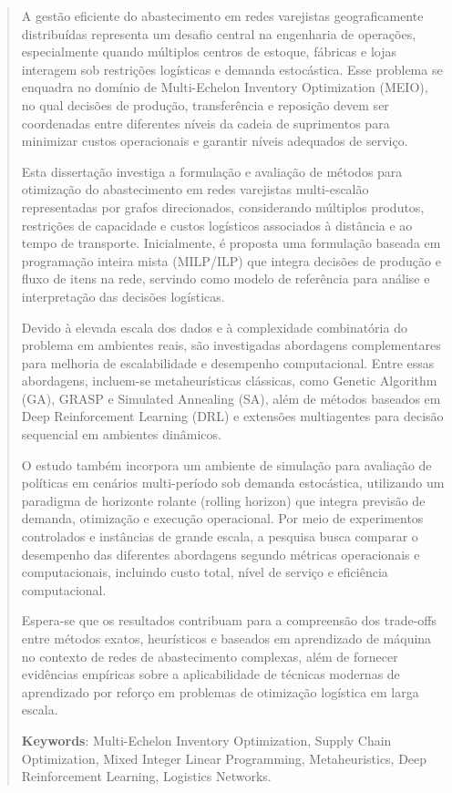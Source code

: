 \documentclass[dissertacao]{ic}
\begin{document}
\begin{abstract}

A gestão eficiente do abastecimento em redes varejistas geograficamente distribuídas representa um desafio central na engenharia de operações, especialmente quando múltiplos centros de estoque, fábricas e lojas interagem sob restrições logísticas e demanda estocástica. Esse problema se enquadra no domínio de Multi-Echelon Inventory Optimization (MEIO), no qual decisões de produção, transferência e reposição devem ser coordenadas entre diferentes níveis da cadeia de suprimentos para minimizar custos operacionais e garantir níveis adequados de serviço.

Esta dissertação investiga a formulação e avaliação de métodos para otimização do abastecimento em redes varejistas multi-escalão representadas por grafos direcionados, considerando múltiplos produtos, restrições de capacidade e custos logísticos associados à distância e ao tempo de transporte. Inicialmente, é proposta uma formulação baseada em programação inteira mista (MILP/ILP) que integra decisões de produção e fluxo de itens na rede, servindo como modelo de referência para análise e interpretação das decisões logísticas.

Devido à elevada escala dos dados e à complexidade combinatória do problema em ambientes reais, são investigadas abordagens complementares para melhoria de escalabilidade e desempenho computacional. Entre essas abordagens, incluem-se metaheurísticas clássicas, como Genetic Algorithm (GA), GRASP e Simulated Annealing (SA), além de métodos baseados em Deep Reinforcement Learning (DRL) e extensões multiagentes para decisão sequencial em ambientes dinâmicos.

O estudo também incorpora um ambiente de simulação para avaliação de políticas em cenários multi-período sob demanda estocástica, utilizando um paradigma de horizonte rolante (rolling horizon) que integra previsão de demanda, otimização e execução operacional. Por meio de experimentos controlados e instâncias de grande escala, a pesquisa busca comparar o desempenho das diferentes abordagens segundo métricas operacionais e computacionais, incluindo custo total, nível de serviço e eficiência computacional.

Espera-se que os resultados contribuam para a compreensão dos trade-offs entre métodos exatos, heurísticos e baseados em aprendizado de máquina no contexto de redes de abastecimento complexas, além de fornecer evidências empíricas sobre a aplicabilidade de técnicas modernas de aprendizado por reforço em problemas de otimização logística em larga escala.

\vspace{2em} 
\textbf{Keywords}: Multi-Echelon Inventory Optimization, Supply Chain Optimization, Mixed Integer Linear Programming, Metaheuristics, Deep Reinforcement Learning, Logistics Networks.

\end{abstract}
\end{document}
